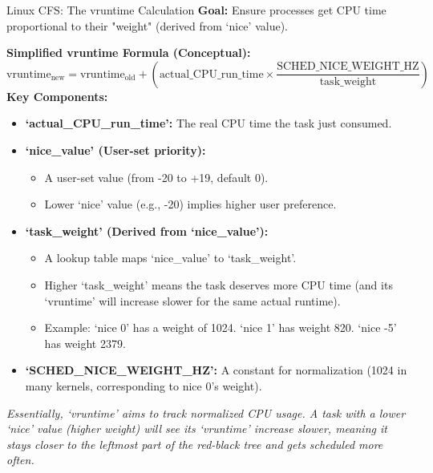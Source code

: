 \documentclass[aspectratio=169,11pt]{beamer}
\begin{document}
\begin{frame}[allowframebreaks]{Linux CFS: The vruntime Calculation}
  \small
  \textbf{Goal:} Ensure processes get CPU time proportional to their "weight" (derived from `nice' value).

  \vspace{0.3cm}
  \textbf{Simplified vruntime Formula (Conceptual):}
  \[
  \text{vruntime}_{\text{new}} = \text{vruntime}_{\text{old}} + \left( \text{actual\_CPU\_run\_time} \times \frac{\text{SCHED\_NICE\_WEIGHT\_HZ}}{\text{task\_weight}} \right)
  \]
  \vspace{0.3cm}
  \textbf{Key Components:}
  \begin{itemize}
    \item \textbf{`actual\_CPU\_run\_time':} The real CPU time the task just consumed.
    \item \textbf{`nice\_value' (User-set priority):}
      \begin{itemize}
        \item A user-set value (from -20 to +19, default 0).
        \item Lower `nice' value (e.g., -20) implies higher user preference.
      \end{itemize}
\framebreak
    \item \textbf{`task\_weight' (Derived from `nice\_value'):}
      \begin{itemize}
        \item A lookup table maps `nice\_value' to `task\_weight'.
        \item Higher `task\_weight' means the task deserves more CPU time (and its `vruntime' will increase slower for the same actual runtime).
        \item Example: `nice 0' has a weight of 1024. `nice 1' has weight 820. `nice -5' has weight 2379.
      \end{itemize}
    \item \textbf{`SCHED\_NICE\_WEIGHT\_HZ':} A constant for normalization (1024 in many kernels, corresponding to nice 0's weight).
  \end{itemize}
  \vspace{0.1cm}
  \textit{Essentially, `vruntime' aims to track normalized CPU usage. A task with a lower `nice' value (higher weight) will see its `vruntime' increase slower, meaning it stays closer to the leftmost part of the red-black tree and gets scheduled more often.}
\end{frame}
\end{document}
